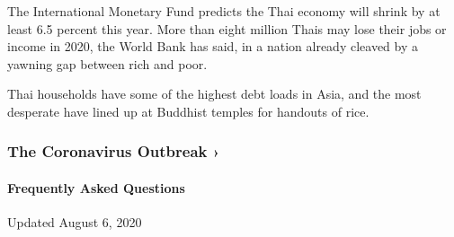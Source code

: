 The International Monetary Fund predicts the Thai economy will shrink by
at least 6.5 percent this year. More than eight million Thais may lose
their jobs or income in 2020, the World Bank has said, in a nation
already cleaved by a yawning gap between rich and poor.

Thai households have some of the highest debt loads in Asia, and the
most desperate have lined up at Buddhist temples for handouts of rice.

\href{https://www.nytimes.com/news-event/coronavirus?action=click\&pgtype=Article\&state=default\&region=MAIN_CONTENT_3\&context=storylines_faq}{}

\hypertarget{the-coronavirus-outbreak-}{%
\subsubsection{The Coronavirus Outbreak
›}\label{the-coronavirus-outbreak-}}

\hypertarget{frequently-asked-questions}{%
\paragraph{Frequently Asked
Questions}\label{frequently-asked-questions}}

Updated August 6, 2020

